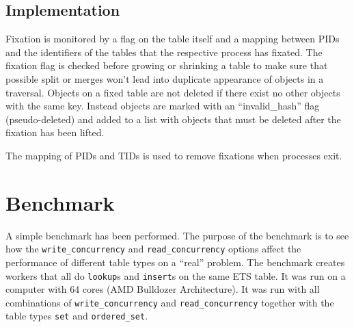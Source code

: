 \documentclass[aps,pre,preprint,nofootinbib]{revtex4}
\begin{document}
\subsection{Implementation}

Fixation is monitored by a flag on the table itself and a mapping between PIDs and the identifiers of the tables that the respective process has fixated.
The fixation flag is checked before growing or shrinking a table to make sure that possible split or merges won't lead into duplicate appearance of objects in a traversal.
Objects on a fixed table are not deleted if there exist no other objects with the same key.
Instead objects are marked with an ``invalid\_hash'' flag (pseudo-deleted) and added to a list with objects that must be deleted after the fixation has been lifted.

The mapping of PIDs and TIDs is used to remove fixations when processes exit.

\section{Benchmark} \label{sec:benchmark}

A simple benchmark has been performed.
The purpose of the benchmark is to see how the \verb|write_concurrency| and \verb|read_concurrency| options affect the performance of different table types on a ``real'' problem.
The benchmark creates workers that all do \verb|lookup|s and \verb|insert|s on the same ETS table.
It was run on a computer with 64 cores (AMD Bulldozer Architecture).
It was run with all combinations of \verb|write_concurrency| and \verb|read_concurrency| together with the table types \verb|set| and \verb|ordered_set|.
\end{document}
